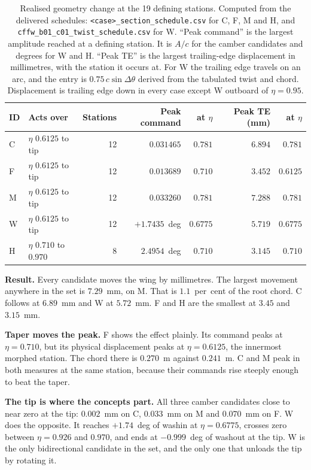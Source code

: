 \begin{table}[htbp]
  \centering
  \footnotesize
  \setlength{\tabcolsep}{4pt}
  \caption{Realised geometry change at the 19 defining stations. Computed from the delivered
  schedules: \texttt{<case>\_section\_schedule.csv} for C, F, M and H, and
  \texttt{cffw\_b01\_c01\_twist\_schedule.csv} for W. ``Peak command'' is the largest amplitude
  reached at a defining station. It is $A/c$ for the camber candidates and degrees for W and H.
  ``Peak TE'' is the largest trailing-edge displacement in millimetres, with the station it
  occurs at. For W the trailing edge travels on an arc, and the entry is
  $0.75\,c\sin\Delta\theta$ derived from the tabulated twist and chord. Displacement is trailing
  edge down in every case except W outboard of $\eta = 0.95$.}
  \label{tab:geom:delta}
  \begin{tabular}{llrrrrr}
    \toprule
    ID & Acts over & Stations & Peak command & at $\eta$ & Peak TE (mm) & at $\eta$ \\
    \midrule
    C & $\eta$ $0.6125$ to tip & 12 & $0.031465$   & $0.781$ & $6.894$ & $0.781$ \\
    F & $\eta$ $0.6125$ to tip & 12 & $0.013689$   & $0.710$ & $3.452$ & $0.6125$ \\
    M & $\eta$ $0.6125$ to tip & 12 & $0.033260$   & $0.781$ & $7.288$ & $0.781$ \\
    W & $\eta$ $0.6125$ to tip & 12 & $+1.7435$~deg & $0.6775$ & $5.719$ & $0.6775$ \\
    H & $\eta$ $0.710$ to $0.970$ & 8 & $2.4954$~deg & $0.710$ & $3.145$ & $0.710$ \\
    \bottomrule
  \end{tabular}
\end{table}

\textbf{Result.} Every candidate moves the wing by millimetres. The largest movement anywhere in
the set is $7.29$~mm, on M. That is $1.1$~per~cent of the root chord. C follows at $6.89$~mm and
W at $5.72$~mm. F and H are the smallest at $3.45$ and $3.15$~mm.

\textbf{Taper moves the peak.} F shows the effect plainly. Its command peaks at $\eta = 0.710$,
but its physical displacement peaks at $\eta = 0.6125$, the innermost morphed station. The chord
there is $0.270$~m against $0.241$~m. C and M peak in both measures at the same station, because
their commands rise steeply enough to beat the taper.

\textbf{The tip is where the concepts part.} All three camber candidates close to near zero at the
tip: $0.002$~mm on C, $0.033$~mm on M and $0.070$~mm on F. W does the opposite. It reaches
$+1.74$~deg of washin at $\eta = 0.6775$, crosses zero between $\eta = 0.926$ and $0.970$, and
ends at $-0.999$~deg of washout at the tip. W is the only bidirectional candidate in the set, and
the only one that unloads the tip by rotating it.

